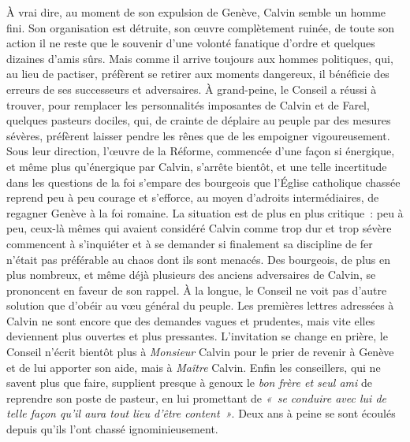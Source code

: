 \documentclass[french,twoside]{book} %
\begin{document}
À vrai dire, au moment de son expulsion de Genève, Calvin semble un homme fini. Son organisation est détruite, son œuvre complètement ruinée, de toute son action il ne reste que le souvenir d’une volonté fanatique d’ordre et quelques dizaines d’amis sûrs. Mais comme il arrive toujours aux hommes politiques, qui, au lieu de pactiser, préfèrent se retirer aux moments dangereux, il bénéficie des erreurs de ses successeurs et adversaires. À grand-peine, le Conseil a réussi à trouver, pour remplacer les personnalités imposantes de Calvin et de Farel, quelques pasteurs dociles, qui, de crainte de déplaire au peuple par des mesures sévères, préfèrent laisser pendre les rênes que de les empoigner vigoureusement. Sous leur direction, l’œuvre de la Réforme, commencée d’une façon si énergique, et même plus qu’énergique par Calvin, s’arrête bientôt, et une telle incertitude dans les questions de la foi s’empare des bourgeois que l’Église catholique chassée reprend peu à peu courage et s’efforce, au moyen d’adroits intermédiaires, de regagner Genève à la foi romaine. La situation est de plus en plus critique : peu à peu, ceux-là mêmes qui avaient considéré Calvin comme trop dur et trop sévère commencent à s’inquiéter et à se demander si finalement sa discipline de fer n’était pas préférable au chaos dont ils sont menacés. Des bourgeois, de plus en plus nombreux, et même déjà plusieurs des anciens adversaires de Calvin, se prononcent en faveur de son rappel. À la longue, le Conseil ne voit pas d’autre solution que d’obéir au vœu général du peuple. Les premières lettres adressées à Calvin ne sont encore que des demandes vagues et prudentes, mais vite elles deviennent plus ouvertes et plus pressantes. L’invitation se change en prière, le Conseil n’écrit bientôt plus à \emph{Monsieur} Calvin pour le prier de revenir à Genève et de lui apporter son aide, mais à \emph{Maître} Calvin. Enfin les conseillers, qui ne savent plus que faire, supplient presque à genoux le \emph{bon frère et seul ami} de reprendre son poste de pasteur, en lui promettant de \emph{« se conduire avec lui de telle façon qu’il aura tout lieu d’être content »}. Deux ans à peine se sont écoulés depuis qu’ils l’ont chassé ignominieusement.\par
\end{document}
